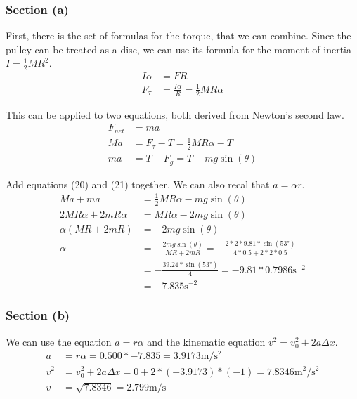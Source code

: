 \documentclass[12pt]{article}
\begin{document}
\subsubsection{Section (a)}
First, there is the set of formulas for the torque, that we can combine. Since the pulley can be treated as a disc, we can use its formula for the moment of inertia \(I = \frac{1}{2}MR^2\).
\begin{align}
    I\alpha &=  F R\\
    F_\tau  &=  \frac{I\alpha}{R}
        =   \frac{1}{2}MR\alpha
\end{align}

This can be applied to two equations, both derived from Newton's second law.
\begin{align}
    F_{net} &=  ma\\
    Ma  &=  F_\tau - T
        =   \frac{1}{2}MR\alpha - T\\
    ma  &=  T - F_g
        =   T - mg\sin(\theta)
\end{align}

Add equations (20) and (21) together. We can also recal that \(a = \alpha r\).
\begin{align}
    Ma + ma &=  \frac{1}{2}MR\alpha - mg\sin(\theta)\\
    2MR\alpha + 2mR\alpha   &=  MR\alpha - 2mg\sin(\theta)\\
    \alpha (MR + 2mR)   &=  -2mg\sin(\theta)\\
    \alpha  &=  -\frac{2mg\sin(\theta)}{MR + 2mR}
        =   -\frac{2*2*9.81*\sin(53\unit{\degree})}{4*0.5 + 2*2*0.5}\\
        &=  -\frac{39.24*\sin(53\unit{\degree})}{4}
        =   -9.81*0.7986 \unit{\second^{-2}}\\
        &=  \boxed{-7.835 \unit{\second^{-2}}}
\end{align}

\subsubsection{Section (b)}
We can use the equation $a = r\alpha$ and the kinematic equation $v^2 = v_0^2 + 2a\Delta x$.
\begin{align}
    a   &=  r\alpha 
        =   0.500 * -7.835
        =   3.9173 \unit{\meter/\second^2}\\
    v^2 &=  v_0^2 + 2a\Delta x
        =   0 + 2 * (-3.9173) * (-1)
        =   7.8346 \unit{\meter^2/\second^2}\\
    v   &=  \sqrt{7.8346}
        =   \boxed{2.799 \unit{\meter/\second}}
\end{align}
\end{document}
